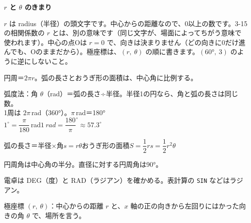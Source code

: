\begin{seikaku}
\textbf{$r$ と $\theta$ のきまり}\par
$r$ は radius（半径）の頭文字です。中心からの距離なので、0以上の数です。3-15の相関係数の $r$ とは、別の意味です（同じ文字が、場面によってちがう意味で使われます）。中心の点Oは $r=0$ で、向きは決まりません（どの向きに0だけ進んでも、Oのままだから）。極座標は、$(r,\ \theta)$ の順に書きます。$(60°,\ 3)$ のように逆にしないこと。
\end{seikaku}


\begin{taisetsu}
円周＝$2\pi r$。弧の長さとおうぎ形の面積は、中心角に比例する。\par\vspace{2pt}
弧度法：角 $\theta$（rad）＝弧の長さ÷半径。半径1の円なら、角と弧の長さは同じ数。\\
1周は $2\pi$\,rad（360°）。$\pi$\,rad＝180°\\
$1^{\circ}=\dfrac{\pi}{180}$\,rad\qquad $\qty{1}{rad}=\dfrac{180}{\pi}^{\circ}\approx57.3^{\circ}$\par\vspace{2pt}
弧の長さ＝半径×角\quad $s=r\theta$\qquad おうぎ形の面積\quad $S=\dfrac{1}{2}rs=\dfrac{1}{2}r^2\theta$\par\vspace{2pt}
円周角は中心角の半分。直径に対する円周角は90°。\par\vspace{2pt}
電卓は DEG（度）と RAD（ラジアン）を確かめる。表計算の \texttt{SIN} などはラジアン。\par\vspace{2pt}
極座標 $(r,\ \theta)$：中心からの距離 $r$ と、$x$ 軸の正の向きから左回りにはかった向きの角 $\theta$ で、場所を言う。
\end{taisetsu}

\begin{kotoba}
\small
{}
\end{kotoba}

